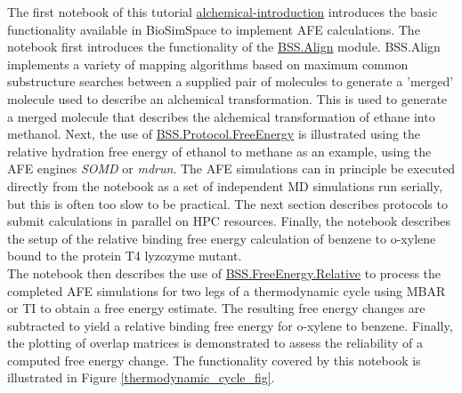 The first notebook of this tutorial \href{https://github.com/OpenBioSim/biosimspace_tutorials/blob/main/04_fep/01_intro_to_alchemy/alchemical_introduction.ipynb}{alchemical-introduction} introduces the basic functionality available in BioSimSpace to implement AFE calculations. 
The notebook first introduces the functionality of the \href{https://biosimspace.openbiosim.org/api/index_Align.html}{BSS.Align} module. BSS.Align implements a variety of mapping algorithms based on maximum common substructure searches between a supplied pair of molecules to generate a 'merged' molecule used to describe an alchemical transformation. This is used to generate a merged molecule that describes the alchemical transformation of ethane into methanol.
Next, the use of \href{https://biosimspace.openbiosim.org/api/generated/BioSimSpace.Protocol.FreeEnergy.html#BioSimSpace.Protocol.FreeEnergy}{BSS.Protocol.FreeEnergy} is illustrated using the relative hydration free energy of ethanol to methane as an example, using the AFE engines \emph{SOMD} \cite{Calabr2016} or \emph{mdrun}. 
The AFE simulations can in principle be executed directly from the notebook as a set of independent MD simulations run serially, but this is often too slow to be practical. The next section describes protocols to submit calculations in parallel on HPC resources.
Finally, the notebook describes the setup of the relative binding free energy calculation of benzene to o-xylene bound to the protein T4 lyzozyme mutant. 
\\
The notebook then describes the use of \href{https://biosimspace.openbiosim.org/api/generated/BioSimSpace.FreeEnergy.Relative.html#}{BSS.FreeEnergy.Relative} to process the completed AFE simulations for two legs of a thermodynamic cycle using MBAR or TI to obtain a free energy estimate. The resulting free energy changes are subtracted to yield a relative binding free energy for o-xylene to benzene. Finally, the plotting of overlap matrices is demonstrated to assess the reliability of a computed free energy change. The functionality covered by this notebook is illustrated in Figure \ref{thermodynamic_cycle_fig}.

